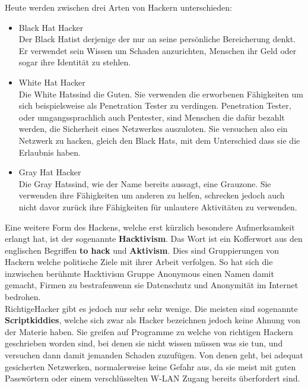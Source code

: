 \documentclass[12pt,a4paper]{report}
\begin{document}
Heute werden zwischen drei Arten von Hackern unterschieden:
\begin{itemize}
\item Black Hat Hacker\\
Der \glqq Black Hat\grqq ist derjenige der nur an seine persönliche Bereicherung denkt. Er verwendet sein Wissen um Schaden anzurichten, Menschen ihr Geld oder sogar ihre Identität zu stehlen. 
\item White Hat Hacker\\
Die \glqq White Hats\grqq sind die \glqq Guten\grqq . Sie verwenden die erworbenen Fähigkeiten um sich beispielsweise als Penetration Tester zu verdingen. Penetration Tester, oder umgangssprachlich auch Pentester, sind Menschen die dafür bezahlt werden, die Sicherheit eines Netzwerkes auszuloten. Sie versuchen also ein Netzwerk zu hacken, gleich den Black Hats, mit dem Unterschied dass sie die Erlaubnis haben.
\item Gray Hat Hacker\\
Die \glqq Gray Hats\grqq sind, wie der Name bereits aussagt, eine Grauzone. Sie verwenden ihre Fähigkeiten um anderen zu helfen, schrecken jedoch auch nicht davor zurück ihre Fähigkeiten für unlautere Aktivitäten zu verwenden.
\end{itemize}

Eine weitere Form des Hackens, welche erst kürzlich besondere Aufmerksamkeit erlangt hat, ist der sogenannte \textbf{Hacktivism}. Das Wort ist ein Kofferwort aus den englischen Begriffen \textbf{to hack} und \textbf{Aktivism}. Dies sind Gruppierungen von Hackern welche politische Ziele mit ihrer Arbeit verfolgen. So hat sich die inzwischen berühmte Hacktivism Gruppe Anonymous einen Namen damit gemacht, Firmen zu \glqq bestrafen\grqq wenn sie Datenschutz und Anonymität im Internet bedrohen.\\

\glqq Richtige\grqq Hacker gibt es jedoch nur sehr sehr wenige. Die meisten sind sogenannte \textbf{Scriptkiddies}, welche sich zwar als Hacker bezeichnen jedoch keine Ahnung von der Materie haben. Sie greifen auf Programme zu welche von richtigen Hackern geschrieben worden sind, bei denen sie nicht wissen müssen was sie tun, und versuchen dann damit jemanden Schaden zuzufügen. Von denen geht, bei adequat gesicherten Netzwerken, normalerweise keine Gefahr aus, da sie meist mit guten Passwörtern oder einem verschlüsselten W-LAN Zugang bereits überfordert sind.
\end{document}
